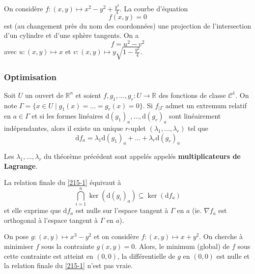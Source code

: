 
  \begin{example}
    On considère $f : (x,y) \mapsto x^2-y^2+\frac{y^4}{4}$. La courbe d'équation
    \[ f(x,y) = 0 \]
    est (au changement près du nom des coordonnées) une projection de l'intersection d'un cylindre et d'une sphère tangents. On a
    \[ f = u^2 - v^2 \]
    avec $u : (x,y) \mapsto x$ et $v : (x,y) \mapsto y \sqrt{1-\frac{y^2}{4}}$.
  \end{example}

  \subsubsection{Optimisation}


  \begin{theorem}
    \label{215-1}
    Soit $U$ un ouvert de $\mathbb{R}^n$ et soient $f, g_1, \dots, g_r : U \rightarrow \mathbb{R}$ des fonctions de classe $\mathcal{C}^1$. On note $\Gamma = \{ x \in U \mid g_1(x) = \dots = g_r(x) = 0 \}$. Si $f_{|\Gamma}$ admet un extremum relatif en $a \in \Gamma$ et si les formes linéaires $\mathrm{d}(g_1)_a, \dots, \mathrm{d}(g_r)_a$ sont linéairement indépendantes, alors il existe un unique $r$-uplet $(\lambda_1, \dots, \lambda_r)$ tel que
    \[ \mathrm{d}f_a = \lambda_1 \mathrm{d}(g_1)_a + \dots + \lambda_r \mathrm{d}(g_r)_a \]
  \end{theorem}

  \begin{definition}
    Les $\lambda_1, \dots, \lambda_r$ du théorème précédent sont appelés appelés \textbf{multiplicateurs de Lagrange}.
  \end{definition}


  \begin{remark}
    La relation finale du \cref{215-1} équivaut à
    \[ \bigcap_{i=1}^n \ker(\mathrm{d}(g_i)_a) \subseteq \ker(\mathrm{d}f_a) \]
    et elle exprime que $\mathrm{d}f_a$ est nulle sur l'espace tangent à $\Gamma$ en $a$ (ie. $\nabla f_a$ est orthogonal à l'espace tangent à $\Gamma$ en $a$).
  \end{remark}

  \begin{cexample}
    On pose $g : (x,y) \mapsto x^3-y^2$ et on considère $f : (x, y) \mapsto x+y^2$. On cherche à minimiser $f$ sous la contrainte $g(x,y) = 0$.
    \newpar
    Alors, le minimum (global) de $f$ sous cette contrainte est atteint en $(0,0)$, la différentielle de $g$ en $(0,0)$ est nulle et la relation finale du \cref{215-1} n'est pas vraie.
  \end{cexample}

